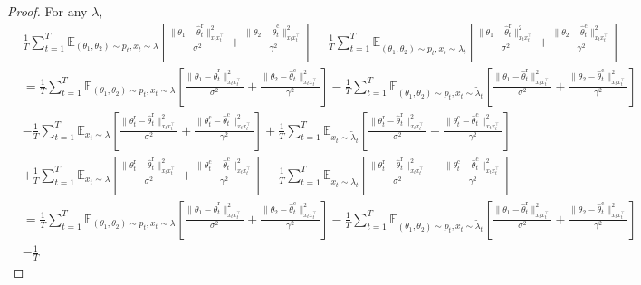 \documentclass[accepted]{uai2025} %
\theoremstyle{plain}
\theoremstyle{definition}
\theoremstyle{remark}
\newcommand{\hthetact}{\hat{\theta}_t^{\mathrm{c}}}
\newcommand{\hthetart}{\hat{\theta}_t^{\mathrm{r}}}
\begin{document}
\begin{proof}
For any $\lambda$, %
\begin{align*}
     &\frac{1}{T} 
\sum_{t=1}^{T} \mathbb{E}_{(\theta_1, \theta_2) \sim p_t, x_t\sim \lambda} 
\left[\frac{\|\theta_1 - \hthetart\|_{x_t x_t^\top}^2}{\sigma^2} 
+ \frac{\|\theta_2 - \hthetact\|_{x_t x_t^\top}^2}{\gamma^2} \right] 
- \frac{1}{T} \sum_{t=1}^{T} \mathbb{E}_{(\theta_1, \theta_2) \sim p_t, x_t\sim \tilde{\lambda}_t} 
\left[\frac{\|\theta_1 - \hthetart\|_{x_t x_t^\top}^2}{\sigma^2} 
+ \frac{\|\theta_2 - \hthetact\|_{x_t x_t^\top}^2}{\gamma^2} \right]
\\&=\frac{1}{T} 
\sum_{t=1}^{T} \mathbb{E}_{(\theta_1, \theta_2) \sim p_t, x_t\sim \lambda} 
\left[\frac{\|\theta_1 \!-\! \hthetart\|_{x_t x_t^\top}^2}{\sigma^2} 
\!+\! \frac{\|\theta_2\! -\! \hthetact\|_{x_t x_t^\top}^2}{\gamma^2} \right] 
\!-\! \frac{1}{T} \sum_{t=1}^{T} \mathbb{E}_{(\theta_1, \theta_2) \sim p_t, x_t\sim \tilde{\lambda}_t} 
\left[\frac{\|\theta_1 \!- \!\hthetart\|_{x_t x_t^\top}^2}{\sigma^2} 
\!+\! \frac{\|\theta_2 \!-\! \hthetact\|_{x_t x_t^\top}^2}{\gamma^2} \right]
\\&-\frac{1}{T} 
\sum_{t=1}^{T} \mathbb{E}_{ x_t\sim \lambda} 
\left[\frac{\|\theta_t^\mathrm{r} - \hthetart\|_{x_t x_t^\top}^2}{\sigma^2} 
+ \frac{\|\theta_t^\mathrm{c} - \hthetact\|_{x_t x_t^\top}^2}{\gamma^2} \right] 
+ \frac{1}{T} \sum_{t=1}^{T} \mathbb{E}_{ x_t\sim \tilde{\lambda}_t} 
\left[\frac{\|\theta_t^\mathrm{r} - \hthetart\|_{x_t x_t^\top}^2}{\sigma^2} 
+ \frac{\|\theta_t^\mathrm{c} - \hthetact\|_{x_t x_t^\top}^2}{\gamma^2} \right]
\\&+\frac{1}{T} 
\sum_{t=1}^{T} \mathbb{E}_{ x_t\sim \lambda} 
\left[\frac{\|\theta_t^\mathrm{r} - \hthetart\|_{x_t x_t^\top}^2}{\sigma^2} 
+ \frac{\|\theta_t^\mathrm{c} - \hthetact\|_{x_t x_t^\top}^2}{\gamma^2} \right] 
- \frac{1}{T} \sum_{t=1}^{T} \mathbb{E}_{ x_t\sim \tilde{\lambda}_t} 
\left[\frac{\|\theta_t^\mathrm{r} - \hthetart\|_{x_t x_t^\top}^2}{\sigma^2} 
+ \frac{\|\theta_t^\mathrm{c} - \hthetact\|_{x_t x_t^\top}^2}{\gamma^2} \right]
\\&=\frac{1}{T} 
\sum_{t=1}^{T} \mathbb{E}_{(\theta_1, \theta_2) \sim p_t, x_t\sim \lambda} 
\left[\frac{\|\theta_1 \!-\! \hthetart\|_{x_t x_t^\top}^2}{\sigma^2} 
\!+\! \frac{\|\theta_2 \!-\! \hthetact\|_{x_t x_t^\top}^2}{\gamma^2} \right] 
\!-\! \frac{1}{T} \sum_{t=1}^{T} \mathbb{E}_{(\theta_1, \theta_2) \sim p_t, x_t\sim \tilde{\lambda}_t} 
\left[\frac{\|\theta_1 \!-\! \hthetart\|_{x_t x_t^\top}^2}{\sigma^2} 
\!+\! \frac{\|\theta_2 \!-\! \hthetact\|_{x_t x_t^\top}^2}{\gamma^2} \right]
\\&-\frac{1}{T} 

\end{align*}
\end{proof}
\end{document}
